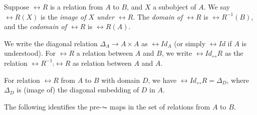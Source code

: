 \begin{definition}
Suppose $\rel{R}$ is a relation from $A$ to $B$, and $X$ a subobject
of $A$. We say $\rel{R}(X)$ is the \emph{image of $X$ under $\rel{R}$}.
The \emph{domain of $\rel{R}$} is $\rel{R}^{-1}(B)$, and the 
\emph{codomain of $\rel{R}$} is $\rel{R}(A)$.
\end{definition}

\begin{definition}
We write the diagonal relation $\Delta_A \to A \times A$ as 
$\rel{Id}_A$ (or simply $\rel{Id}$ if $A$ is understood). 
For $\rel{R}$ a relation between $A$ and $B$, we write 
$\rel{Id}_\rel{R}$ as the relation $\rel{R}^{-1} \comp \rel{R}$ 
as relation between $A$ and $A$.
\end{definition}

\begin{prop}
For relation $\rel{R}$ from $A$ to $B$ with domain $D$, we have 
$\rel{Id}_\rel{R} = \Delta_D$, where $\Delta_D$ is (image of) the 
diagonal embedding of $D$ in $A$.
\end{prop}

The following identifies the pre-$\AC$ maps in the set of relations
from $A$ to $B$.

